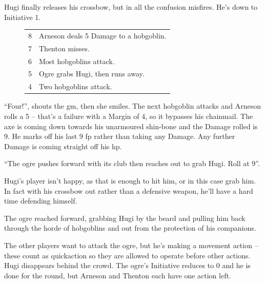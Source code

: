\begin{multicols}{2}
{\begin{exampletext}
	Hugi finally releases his crossbow, but in all the confusion misfires. He's down to Initiative 1.

		\needspace{3cm}
		\begin{figure}

			\begin{tabularx}{.3\textwidth}{c|X}
				\setcounter{enc}{12}

				8 & Arneson deals 5 Damage to a hobgoblin. \\

				7 & Thenton misses. \\

				6 & Most hobgoblins attack. \\

				5 & Ogre grabs Hugi, then runs away. \\
				4 & Two hobgoblins attack. \\


			\end{tabularx}

		\end{figure}

	``Four!'', shouts the \gls{gm}, then she smiles. The next hobgoblin attacks and Arneson rolls a 5 -- that's a failure with a Margin of 4, so it bypasses his chainmail. The axe is coming down towards his unarmoured shin-bone and the Damage rolled is 9. He marks off his last 9 \gls{fp} rather than taking any Damage. Any further Damage is coming straight off his \gls{hp}.

	``The ogre pushes forward with its club then reaches out to grab Hugi. Roll at  9''.

	Hugi's player isn't happy, as that is enough to hit him, or in this case grab him. In fact with his crossbow out rather than a defensive weapon, he'll have a hard time defending himself.

	The ogre reached forward, grabbing Hugi by the beard and pulling him back through the horde of hobgoblins and out from the protection of his companions.

	The other players want to attack the ogre, but he's making a movement action -- these count as \gls{quickaction} so they are allowed to operate before other actions.
	Hugi disappears behind the crowd.
	The ogre's Initiative reduces to 0 and he is done for the \gls{round}, but Arneson and Thenton each have one action left.

\end{exampletext}

}{}

\end{multicols}

